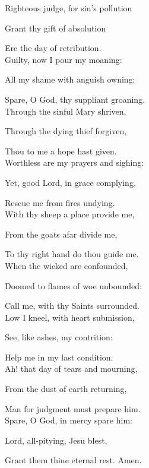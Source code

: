 {\begin{multicols}{2}
Righteous judge, for sin's pollution

Grant thy gift of absolution

Ere the day of retribution.\\

Guilty, now I pour my moaning:

All my shame with anguish owning:

Spare, O God, thy suppliant groaning.\\

Through the sinful Mary shriven,

Through the dying thief forgiven,

Thou to me a hope hast given.\\

Worthless are my prayers and sighing:

Yet, good Lord, in grace complying,

Rescue me from fires undying.\\

With thy sheep a place provide me,

From the goats afar divide me,

To thy right hand do thou guide me.\\

When the wicked are confounded,

Doomed to flames of woe unbounded:

Call me, with thy Saints surrounded.\\

Low I kneel, with heart submission,

See, like ashes, my contrition:

Help me in my last condition.\\

Ah! that day of tears and mourning,

From the dust of earth returning,

Man for judgment must prepare him.\\

Spare, O God, in mercy spare him:

Lord, all-pitying, Jesu blest,

Grant them thine eternal rest. Amen.
\end{multicols}}
